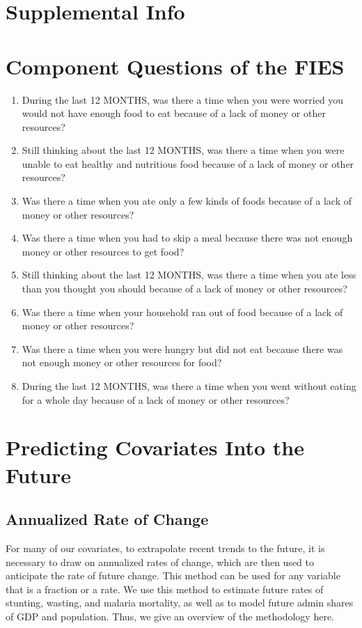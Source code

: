 \documentclass{article}
\begin{document}
\printbibliography

\section*{Supplemental Info}
\setcounter{table}{0}
\setcounter{figure}{0}
\setcounter{section}{0}
\renewcommand{\thetable}{S\arabic{table}}
\renewcommand{\thefigure}{S\arabic{figure}}
\renewcommand{\thesection}{S\arabic{section}}

\section{Component Questions of the FIES}
\begin{enumerate}
	\item During the last 12 MONTHS, was there a time when you were worried you would not have enough food to eat because of a lack of money or other resources?
	\item Still thinking about the last 12 MONTHS, was there a time when you were unable to eat healthy and nutritious food because of a lack of money or other resources?
	\item Was there a time when you ate only a few kinds of foods because of a lack of money or other resources?
	\item Was there a time when you had to skip a meal because there was not enough money or other resources to get food?
	\item Still thinking about the last 12 MONTHS, was there a time when you ate less than you thought you should because of a lack of money or other resources?
	\item Was there a time when your household ran out of food because of a lack of money or other resources?
	\item Was there a time when you were hungry but did not eat because there was not enough money or other resources for food?
	\item During the last 12 MONTHS, was there a time when you went without eating for a whole day because of a lack of money or other resources?
\end{enumerate}

\section{Predicting Covariates Into the Future}
\subsection{Annualized Rate of Change}
For many of our covariates, to extrapolate recent trends to the future, it is necessary to draw on annualized rates of change, which are then used to anticipate the rate of future change.  This method can be used for any variable that is a fraction or a rate.  We use this method to estimate future rates of stunting, wasting, and malaria mortality, as well as to model future admin shares of GDP and population.  Thus, we give an overview of the methodology here.
\end{document}
